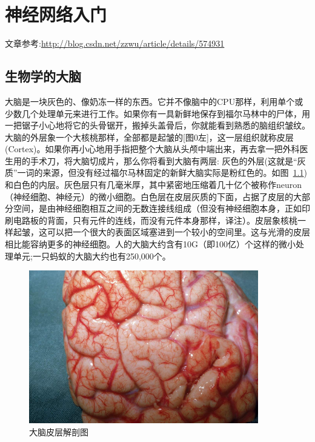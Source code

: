 \chapter{神经网络入门}

文章参考:\url{http://blog.csdn.net/zzwu/article/details/574931}

\section{生物学的大脑}
大脑是一块灰色的、像奶冻一样的东西。它并不像脑中的CPU那样，利用单个或少数几个处理单元来进行工作。如果你有一具新鲜地保存到福尔马林中的尸体，用一把锯子小心地将它的头骨锯开，搬掉头盖骨后，你就能看到熟悉的脑组织皱纹。大脑的外层象一个大核桃那样，全部都是起皱的[图0左]，这一层组织就称皮层(Cortex)。如果你再小心地用手指把整个大脑从头颅中端出来，再去拿一把外科医生用的手术刀，将大脑切成片，那么你将看到大脑有两层: 灰色的外层(这就是“灰质”一词的来源，但没有经过福尔马林固定的新鲜大脑实际是粉红色的。如图~\ref{大脑皮层解剖图}) 和白色的内层。灰色层只有几毫米厚，其中紧密地压缩着几十亿个被称作neuron（神经细胞、神经元）的微小细胞。白色层在皮层灰质的下面，占据了皮层的大部分空间，是由神经细胞相互之间的无数连接线组成（但没有神经细胞本身，正如印刷电路板的背面，只有元件的连线，而没有元件本身那样，译注）。皮层象核桃一样起皱，这可以把一个很大的表面区域塞进到一个较小的空间里。这与光滑的皮层相比能容纳更多的神经细胞。人的大脑大约含有10G（即100亿）个这样的微小处理单元;一只蚂蚁的大脑大约也有250,000个。
\begin{figure}[H]
  \centering
  \includegraphics[width=10cm]{Figures/大脑皮层解剖图.jpg}
  \caption{大脑皮层解剖图}\label{大脑皮层解剖图}
\end{figure}

